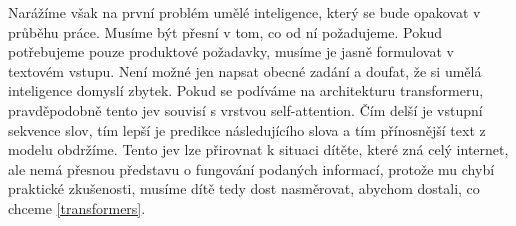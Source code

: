 \documentclass[FM,DP]{tulthesis}
\begin{document}
		Narážíme však na první problém umělé inteligence, který se bude opakovat v průběhu práce. Musíme být přesní v tom, co od ní požadujeme. Pokud potřebujeme pouze produktové požadavky, musíme je jasně formulovat v textovém vstupu. Není možné jen napsat obecné zadání a doufat, že si umělá inteligence domyslí zbytek. Pokud se podíváme na architekturu transformeru, pravděpodobně tento jev souvisí s vrstvou self-attention. Čím delší je vstupní sekvence slov, tím lepší je predikce následujícího slova a tím přínosnější text z modelu obdržíme. Tento jev lze přirovnat k situaci dítěte, které zná celý internet, ale nemá přesnou představu o fungování podaných informací, protože mu chybí praktické zkušenosti, musíme dítě tedy dost nasměrovat, abychom dostali, co chceme \ref{transformers}.
		
		
\end{document}
